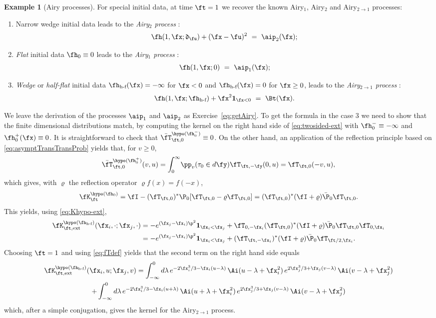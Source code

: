\documentclass[]{pcmi}
\theoremstyle{plain}
\theoremstyle{definition}
\newtheorem{example}[equation]{Example}
\newcommand{\uno}[1]{\mathbf{1}_{#1}}
\begin{document}
\begin{example}[Airy processes] For special initial data, at time $\ft=1$ we recover the known Airy$_1$, Airy$_2$ and Airy$_{2\to1}$ processes:  
\begin{enumerate}
\item Narrow wedge initial data leads to the \emph{Airy$_2$ process} \cite{prahoferSpohn,johansson}:
\[\fh(1,\fx;\mathfrak{d}_\fu) + (\fx-\fu)^2~=~ \aip_2(\fx);\]
\item \emph{Flat} initial data $\fh_0\equiv0$ leads to the \emph{Airy$_1$ process} \cite{sasamoto,borFerPrahSasam}:
\[\fh(1,\fx;0)~=~ \aip_1(\fx);\]
\item \emph{Wedge} or \emph{half-flat} initial data $\fh_{\text{h-f}}(\fx) = -\infty$ for $\fx<0$ and $\fh_{\text{h-f}}(\fx)=0$ for $\fx\geq0$, leads to the \emph{Airy$_{2\to1}$ process} \cite{bfs}:
\[\fh(1,\fx;\fh_{\text{h-f}})+\fx^2\uno{\fx<0}~=~ \Bt(\fx).\]
\end{enumerate}
We leave the derivation of the processes $\aip_1$ and $\aip_2$ as Exercise~\ref{eq:getAiry}. To get the formula in the case 3 we need to show that the finite dimensional distributions match, by computing the kernel on the right hand side of \eqref{eq:twosided-ext} with $\fh_0^-\equiv-\infty$ and $\fh_0^+(\fx)\equiv0$.  
 It is straightforward to check that $\bar{\fT}^{\hypo(\fh_0^-)}_{\ft,0}\equiv0$.
On the other hand, an application of the reflection principle based on \eqref{eq:asymptTransTransProb}  yields that, for $v\geq0$,
\[\bar{\fT}^{\hypo(\fh_0^+)}_{\ft,0}(v,u)=\int_0^\infty\!\pp_v(\tau_0\in d\fy)\fT_{\ft,-\fy}(0,u)=\fT_{\ft,0}(-v,u),\]
which gives, with $\varrho$ the reflection operator $\varrho f(x)=f(-x)$,
\[\fK^{\hypo(\fh_0)}_{\ft}=\fI-(\fT_{\ft,0})^*\P_0[\fT_{\ft,0}-\varrho\fT_{\ft,0}]=(\fT_{\ft,0})^*(\fI+\varrho)\bar \P_0\fT_{\ft,0}.\]
This yields, using \eqref{eq:Khypo-ext},
\begin{align}
\fK^{\hypo(\fh_{\text{h-f}})}_{\ft,\text{ext}}(\fx_i,\cdot;\fx_j,\cdot)&=-e^{(\fx_j-\fx_i)\p^2}\uno{\fx_i<\fx_j}+\fT_{0,-\fx_i}(\fT_{\ft,0})^*(\fI+\varrho)\bar \P_0\fT_{\ft,0}\fT_{0,\fx_i}\\
&=-e^{(\fx_j-\fx_i)\p^2}\uno{\fx_i<\fx_j}+(\fT_{\ft,-\fx_i})^*(\fI+\varrho)\bar \P_0\fT_{\ft/2,\fx_i}.
\end{align}
Choosing $\ft=1$ and using \eqref{eq:fTdef} yields that the second term on the right hand side equals
\begin{multline}
\fK^{\hypo(\fh_{\text{h-f}})}_{\ft,\text{ext}}(\fx_i,u;\fx_j,v)
=\int_{-\infty}^0d\lambda\,e^{-2\fx_i^3/3-\fx_i(u-\lambda)}\,\Ai(u-\lambda+\fx_i^2)\, e^{2\fx_j^3/3+\fx_j(v-\lambda)}\,\Ai(v-\lambda+\fx_j^2)\\
+\int_{-\infty}^0d\lambda\,e^{-2\fx_i^3/3-\fx_i(u+\lambda)}\,\Ai(u+\lambda+\fx_i^2)\, e^{2\fx_j^3/3+\fx_j(v-\lambda)}\,\Ai(v-\lambda+\fx_j^2)
\end{multline}
which, after a simple conjugation, gives the kernel for the Airy$_{2\to1}$ process.
\end{example}
\end{document}
